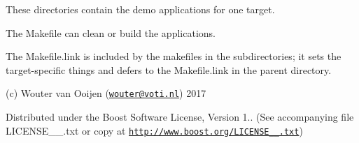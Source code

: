 These directories contain the demo applications for one target.

The Makefile can clean or build the applications.

The Makefile.\+link is included by the makefiles in the subdirectories; it sets the target-\/specific things and defers to the Makefile.\+link in the parent directory.

(c) Wouter van Ooijen (\href{mailto:wouter@voti.nl}{\tt wouter@voti.\+nl}) 2017

Distributed under the Boost Software License, Version 1.. (See accompanying file L\+I\+C\+E\+N\+S\+E\+\_\+\_.\+txt or copy at \href{http://www.boost.org/LICENSE_1_0.txt}{\tt http\+://www.\+boost.\+org/\+L\+I\+C\+E\+N\+S\+E\+\_\+\_.\+txt}) 